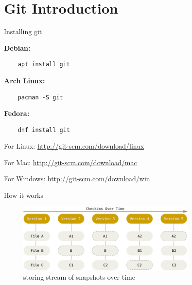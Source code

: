 \section{Git Introduction}

\begin{frame}[fragile]{Installing git}

    \textbf{Debian:}
    \begin{lstlisting}
    apt install git
    \end{lstlisting}

    \textbf{Arch Linux:}
    \begin{lstlisting}
    pacman -S git
    \end{lstlisting}

    \textbf{Fedora:}
    \begin{lstlisting}
    dnf install git
    \end{lstlisting}

    \begin{description}
        \item{For Linux:} \url{http://git-scm.com/download/linux}
        \item{For Mac:} \url{http://git-scm.com/download/mac}
        \item{For Windows:} \url{http://git-scm.com/download/win}
    \end{description}

\end{frame}


\begin{frame}[fragile]{How it works}
    \begin{figure}
        \centering
        \includegraphics[width=0.8\textwidth]{img/snapshotbased.png}
        \caption{storing stream of snapshots over time}
    \end{figure}
\end{frame}



